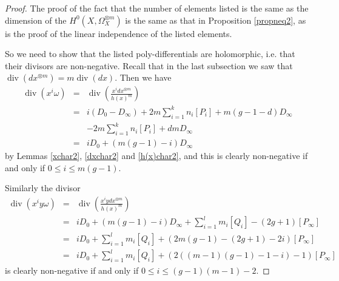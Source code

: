 \documentclass[11pt]{article} %
\theoremstyle{plain}
\theoremstyle{remark}
\DeclareMathOperator{\di}{div}
\begin{document}
\begin{proof}
\begin{comment}
 We first assume that the above elements are holomorphic poly-differentials, and show that they then form a basis.
To show that the elements are linearly independent over $k$ we need only show that the coefficients are, since $\omega$ is fixed.
The only case where this is not clear is when the coefficients contain both $x$ and $y$ terms.
But since the $y$ terms are all linear, and the extension is of degree two, it must follow that coefficients are linearly independent.
 
 
 In the case that $m=1$ then we have that $\dim_k H^0(X,\Omega_X) =g$ by Lemma \ref{dim3}, and there are $g$ elements described in the statement of the proposition in this case, so they must form a basis.
 If $m \geq 2$ then $\dim_k H^0(X,\Omega_X^{\otimes m}) = (2m-1)(g-1)$.
 If $m=g=2$ then $(2m-1)(g-1) = 3$, and there are three elements listed in the proposition.
 On the other hand if $m\geq 2$ and $g > 2$ the proposition lists
 \[
  m(g-1)+1 + (g-1)(m-1)-2+1 = 2mg -2m -g +1 = (2m-1)(g-1)
 \]
 elements, and again they must form a basis.
 \end{comment}
 
 The proof of the fact that the number of elements listed is the same as the dimension of the $H^0(X,\Omega_X^{\otimes m})$ is the same as that in Proposition \ref{propneq2}, as is the proof of the linear independence of the listed elements.
 
 So we need to show that the listed poly-differentials are holomorphic, i.e. that their divisors are non-negative.
 Recall that in the last subsection we saw that $\di (dx^{\otimes m}) = m\di (dx)$.
 Then we have
 \begin{eqnarray*}\label{nonydifferentials}
  \di(x^i\omega) & = & \di \left( \frac{x^i dx^{\otimes m}}{h(x)^m} \right) \nonumber \\ \nonumber & = & i(D_0 - D_\infty) +2m\sum_{i=1}^k n_i[P_i] + m(g-1-d)D_\infty \nonumber \\
  & & -2m\sum_{i=1}^k n_i [P_i] + dmD_\infty \nonumber \\
  & = & iD_0 + (m(g-1) -i)D_\infty
 \end{eqnarray*}
  by Lemmas \ref{xchar2}, \ref{dxchar2} and \ref{h(x)char2}, and this is clearly non-negative if and only if $0\leq i \leq m(g-1)$.
  
  Similarly the divisor 
  \begin{eqnarray*}
   \di(x^iy\omega) & = & \di \left( \frac{x^i ydx^{\otimes m}}{h(x)^m} \right)\nonumber \\ & = & iD_0 + (m(g-1) -i)D_\infty + \sum_{i=1}^l m_i[Q_i] - (2g+1)[P_\infty] \nonumber \\
    & = & iD_0 +  \sum_{i=1}^l m_i[Q_i] + (2m(g-1) -(2g+1) -2i)[P_\infty] \nonumber  \\
   & = & iD_0 +  \sum_{i=1}^l m_i[Q_i] + (2((m-1)(g-1) -1 -i)-1)[P_\infty]
  \end{eqnarray*}
 is clearly non-negative if and only if $0 \leq i \leq (g-1)(m-1)-2$.


\end{proof}
\end{document}
